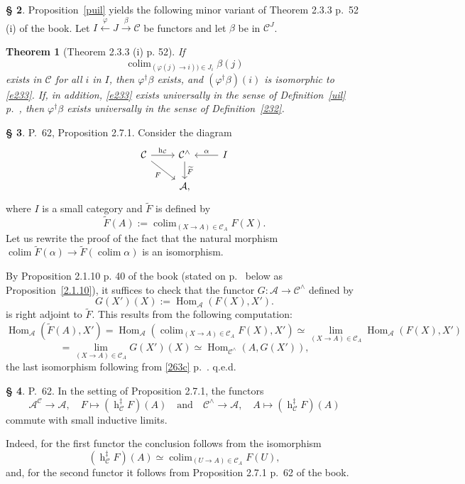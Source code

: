 \documentclass[12pt]{article}%
\newtheorem{thm}{Theorem}%
\theoremstyle{remark}
\theoremstyle{definition}
\newtheorem{s}[thm]{\S}%
\newcommand{\oo}{\operatorname}
\newcommand{\A}{\mathcal A}
\newcommand{\C}{\mathcal C}
\newcommand{\pp}{\varphi}
\newcommand{\xr}{\xrightarrow}
\DeclareMathOperator*{\colim}{colim}%
\DeclareMathOperator{\hy}{h}
\DeclareMathOperator{\Hom}{Hom}%
\begin{document}
\begin{s} 
Proposition~\ref{puil} yields the following minor variant of Theorem 2.3.3 p.~52 (i) of the book. Let $I\xleftarrow\pp J\xr\beta\C$ be functors and let $\beta$ be in $\C^J$. 

\begin{thm}[Theorem 2.3.3 (i) p. 52]\label{233}
If 
%
\begin{equation}\label{e233}
\colim_{(\pp(j)\to i))\in J_i}\beta(j)
\end{equation}
%
exists in $\C$ for all $i$ in $I$, then $\pp^\dagger\beta$ exists, and $(\pp^\dagger\beta)(i)$ is isomorphic to \eqref{e233}. If, in addition, \eqref{e233} exists universally in the sense of Definition~\ref{uil} p.~\pageref{uil}, then $\pp^\dagger\beta$ exists universally in the sense of Definition~\ref{232}. 
\end{thm}
\end{s}

%

\begin{s}\label{c271b}
P.~62, Proposition 2.7.1. Consider the diagram 
$$
\begin{tikzcd}
\C\ar{r}{\hy_\C}\ar{dr}[swap]{F}&\C^\wedge\ar{d}{\widetilde F}&I\ar{l}[swap]{\alpha}\\
&\A,
\end{tikzcd}
$$
where $I$ is a small category and $\widetilde F$ is defined by 
$$
\widetilde F(A):=\colim_{(X\to A)\in\C_A}F(X). 
$$
Let us rewrite the proof of the fact that the natural morphism $\colim\widetilde F(\alpha)\to\widetilde F\left(\colim\alpha\right)$ is an isomorphism. 

By Proposition 2.1.10 p. 40 of the book (stated on p.~\pageref{2.1.10} below as Proposition~\ref{2.1.10}), it suffices to check that the functor $G:\A\to\C^\wedge$ defined by 
$$
G(X')(X):=\Hom_{\A}(F(X),X').
$$ 
is right adjoint to $\widetilde F$. This results from the following computation: 
$$
\Hom_{\A}\left(\widetilde F(A),X'\right)=
\Hom_{\A}\left(\colim_{(X\to A)\in\C_A}F(X),X'\right)\simeq 
\lim_{(X\to A)\in\C_A}\Hom_{\A}(F(X),X')
$$
$$
=\lim_{(X\to A)\in\C_A}G(X')(X)\simeq\Hom_{\C^\wedge}(A,G(X')), 
$$ 
the last isomorphism following from \eqref{263c} p.~\pageref{263c}. q.e.d.
\end{s}

%

\begin{s}\label{bil}
P.~62. In the setting of Proposition 2.7.1, the functors
$$
\A^\C\to\A,\quad F\mapsto(\oo h_\C^\ddagger F)(A)\quad\text{and}\quad
\C^\wedge\to\A,\quad A\mapsto(\oo h_\C^\ddagger F)(A)
$$ 
commute with small inductive limits. 

Indeed, for the first functor the conclusion follows from the isomorphism 
$$
(\oo h_\C^\ddagger F)(A)\simeq\colim_{(U\to A)\in\C_A}F(U),
$$ 
and, for the second functor it follows from Proposition 2.7.1 p.~62 of the book.
\end{s}
\end{document}
